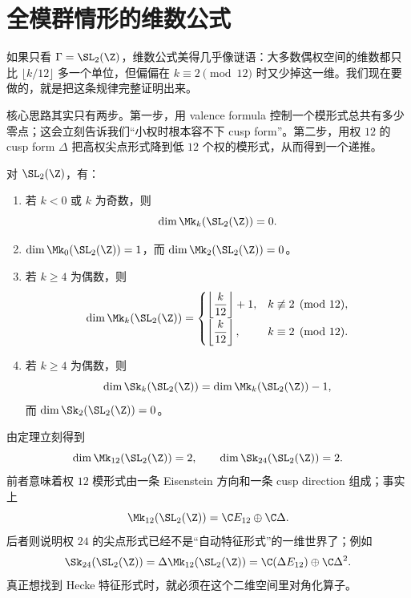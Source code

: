 \section{全模群情形的维数公式}
\label{sec:dim-sl2z}

如果只看 $\Gamma=\SL_2(\Z)$，维数公式美得几乎像谜语：大多数偶权空间的维数都只比 $\lfloor k/12\rfloor$ 多一个单位，但偏偏在 $k\equiv 2\pmod{12}$ 时又少掉这一维。我们现在要做的，就是把这条规律完整证明出来。

核心思路其实只有两步。第一步，用 valence formula 控制一个模形式总共有多少零点；这会立刻告诉我们“小权时根本容不下 cusp form”。第二步，用权 $12$ 的 cusp form $\Delta$ 把高权尖点形式降到低 $12$ 个权的模形式，从而得到一个递推。



\begin{theorem}[全模群的维数公式]
\label{thm:dim-sl2z}
对 $\SL_2(\Z)$，有：
\begin{enumerate}
  \item 若 $k<0$ 或 $k$ 为奇数，则
        \[
          \dim \Mk_k(\SL_2(\Z))=0.
        \]
  \item $\dim \Mk_0(\SL_2(\Z))=1$，而 $\dim \Mk_2(\SL_2(\Z))=0$。
  \item 若 $k\ge 4$ 为偶数，则
        \[
          \dim \Mk_k(\SL_2(\Z))=
          \begin{cases}
            \left\lfloor\dfrac{k}{12}\right\rfloor+1,& k\not\equiv 2 \pmod{12},\\[6pt]
            \left\lfloor\dfrac{k}{12}\right\rfloor,& k\equiv 2 \pmod{12}.
          \end{cases}
        \]
  \item 若 $k\ge 4$ 为偶数，则
        \[
          \dim \Sk_k(\SL_2(\Z))=\dim \Mk_k(\SL_2(\Z))-1,
        \]
        而 $\dim \Sk_2(\SL_2(\Z))=0$。
\end{enumerate}
\end{theorem}

\begin{example}[先看两个最重要的数]
\label{ex:dim-m12-s24}
由定理立刻得到
\[
  \dim \Mk_{12}(\SL_2(\Z))=2,
  \qquad
  \dim \Sk_{24}(\SL_2(\Z))=2.
\]
前者意味着权 $12$ 模形式由一条 Eisenstein 方向和一条 cusp direction 组成；事实上
\[
  \Mk_{12}(\SL_2(\Z))=\C E_{12}\oplus \C\Delta.
\]
后者则说明权 $24$ 的尖点形式已经不是“自动特征形式”的一维世界了；例如
\[
  \Sk_{24}(\SL_2(\Z))=\Delta\Mk_{12}(\SL_2(\Z))
  =\C(\Delta E_{12})\oplus \C\Delta^2.
\]
真正想找到 Hecke 特征形式时，就必须在这个二维空间里对角化算子。
\end{example}

